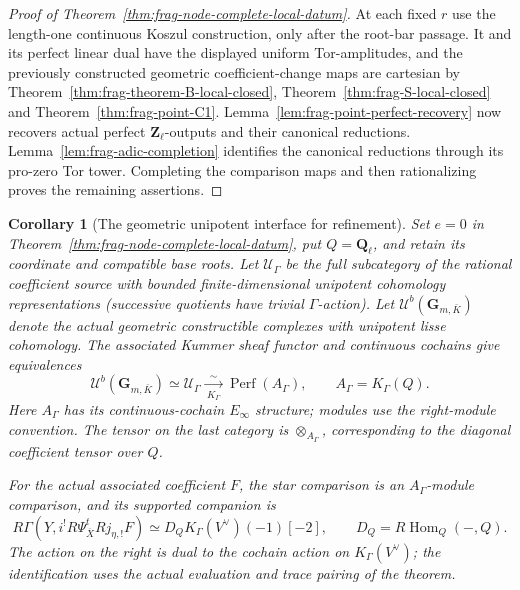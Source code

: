 \documentclass[11pt]{article}
\newtheorem{corollary}[theorem]{Corollary}
\theoremstyle{definition}
\theoremstyle{remark}
\begin{document}
\begin{proof}[Proof of Theorem~\ref{thm:frag-node-complete-local-datum}]
At each fixed $r$ use the length-one continuous Koszul construction,
only after the root-bar passage.  It and its perfect linear dual
have the displayed uniform Tor-amplitudes, and the previously
constructed geometric coefficient-change maps are cartesian by
Theorem~\ref{thm:frag-theorem-B-local-closed}, Theorem~\ref{thm:frag-S-local-closed} and Theorem~\ref{thm:frag-point-C1}.
Lemma~\ref{lem:frag-point-perfect-recovery} now recovers actual
perfect $\mathbf Z_\ell$-outputs and their canonical reductions.
Lemma~\ref{lem:frag-adic-completion} identifies the canonical reductions
through its pro-zero Tor tower.  Completing the comparison maps and
then rationalizing proves the remaining assertions.
\end{proof}


\begin{corollary}[The geometric unipotent interface for refinement]
\label{cor:frag-refinement-unipotent-interface}
Set $e=0$ in Theorem~\ref{thm:frag-node-complete-local-datum}, put
$Q=\mathbf Q_\ell$, and retain its coordinate and compatible base roots.
Let $\mathcal U_\Gamma$ be the full subcategory of the rational
coefficient source with bounded finite-dimensional unipotent cohomology
representations (successive quotients have trivial $\Gamma$-action).
Let $\mathcal U^b(\mathbf G_{m,\bar K})$ denote the actual geometric
constructible complexes with unipotent lisse cohomology.  The associated
Kummer sheaf functor and continuous cochains give equivalences
\[
 \mathcal U^b(\mathbf G_{m,\bar K})\simeq\mathcal U_\Gamma
 \xrightarrow[\ K_\Gamma\ ]{\sim}\operatorname{Perf}(A_\Gamma),
 \qquad A_\Gamma=K_\Gamma(Q).
\]
Here $A_\Gamma$ has its continuous-cochain $E_\infty$ structure;
modules use the right-module convention.  The tensor on the last
category is $\otimes_{A_\Gamma}$, corresponding to the diagonal
coefficient tensor over $Q$.

For the actual associated coefficient $F$, the star comparison is
an $A_\Gamma$-module comparison, and its supported companion is
\[
 R\Gamma(Y,i^!R\Psi^t_{\overline X}Rj_{\eta,!}F)
 \simeq D_QK_\Gamma(V^\vee)(-1)[-2],
 \qquad D_Q=R\operatorname{Hom}_Q(-,Q).
\]
The action on the right is dual to the cochain action on
$K_\Gamma(V^\vee)$; the identification uses the actual evaluation
and trace pairing of the theorem.
\end{corollary}
\end{document}
